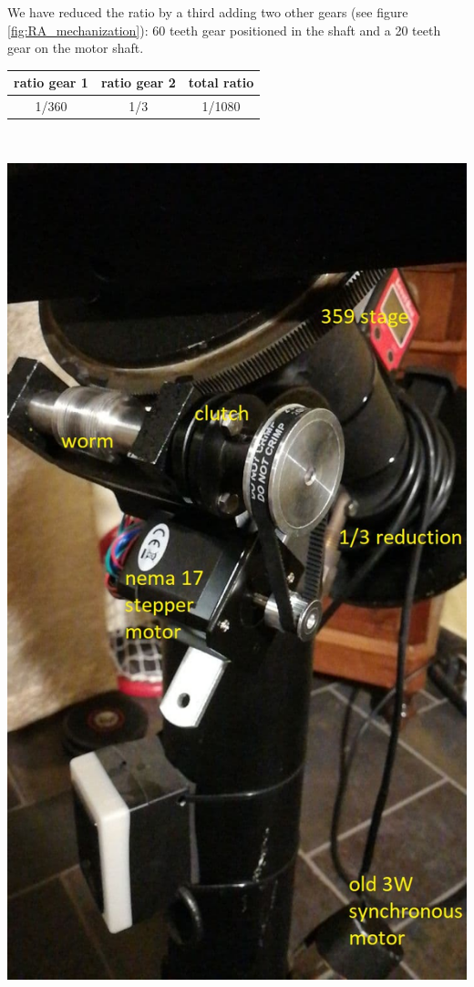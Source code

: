 \documentclass{article}
\begin{document}
\begin{multicols}{2}
        We have reduced the ratio by a third adding two other gears (see figure \ref{fig:RA_mechanization}): 60 teeth gear positioned in the shaft and a 20 teeth gear on the motor shaft.
        \\
        \begin{minipage}{.4\textwidth}
            \begin{tabular}{cc|c}
                ratio gear 1 & ratio gear 2 & total ratio \\
                \hline
                1/360 & 1/3 & 1/1080 \\
                \hline
            \end{tabular}
            \label{tab:RA_mechanization}
        \end{minipage}
        \\
        \begin{minipage}{.4\textwidth}
            \centering
            \includegraphics[scale=0.6]{RA_motorization.jpg}  

\end{minipage}
\end{multicols}
\end{document}
